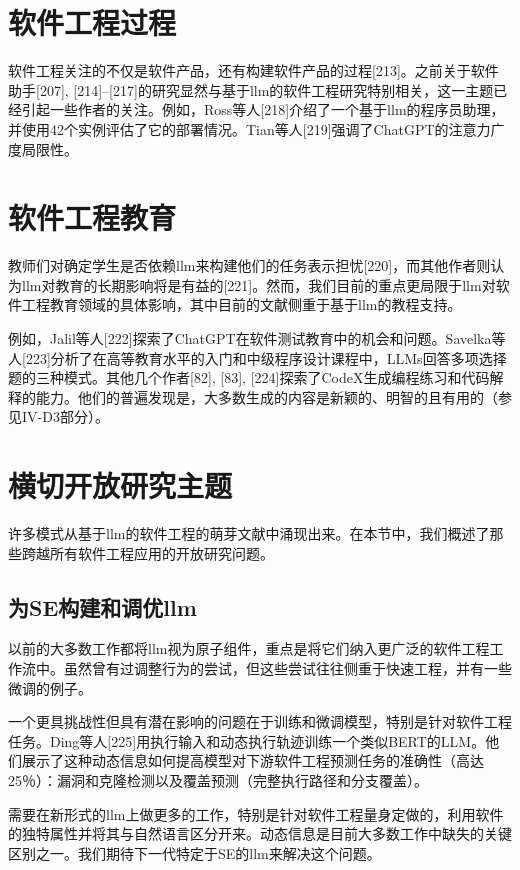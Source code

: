 \begin{translation}
\section{软件工程过程}

软件工程关注的不仅是软件产品，还有构建软件产品的过程[213]。之前关于软件助手[207], [214]–[217]的研究显然与基于llm的软件工程研究特别相关，这一主题已经引起一些作者的关注。例如，Ross等人[218]介绍了一个基于llm的程序员助理，并使用42个实例评估了它的部署情况。Tian等人[219]强调了ChatGPT的注意力广度局限性。

\section{软件工程教育}

教师们对确定学生是否依赖llm来构建他们的任务表示担忧[220]，而其他作者则认为llm对教育的长期影响将是有益的[221]。然而，我们目前的重点更局限于llm对软件工程教育领域的具体影响，其中目前的文献侧重于基于llm的教程支持。

例如，Jalil等人[222]探索了ChatGPT在软件测试教育中的机会和问题。Savelka等人[223]分析了在高等教育水平的入门和中级程序设计课程中，LLMs回答多项选择题的三种模式。其他几个作者[82], [83], [224]探索了CodeX生成编程练习和代码解释的能力。他们的普遍发现是，大多数生成的内容是新颖的、明智的且有用的（参见IV-D3部分）。

\section{横切开放研究主题}

许多模式从基于llm的软件工程的萌芽文献中涌现出来。在本节中，我们概述了那些跨越所有软件工程应用的开放研究问题。

\subsection{为SE构建和调优llm}

以前的大多数工作都将llm视为原子组件，重点是将它们纳入更广泛的软件工程工作流中。虽然曾有过调整行为的尝试，但这些尝试往往侧重于快速工程，并有一些微调的例子。

一个更具挑战性但具有潜在影响的问题在于训练和微调模型，特别是针对软件工程任务。Ding等人[225]用执行输入和动态执行轨迹训练一个类似BERT的LLM。他们展示了这种动态信息如何提高模型对下游软件工程预测任务的准确性（高达25％）：漏洞和克隆检测以及覆盖预测（完整执行路径和分支覆盖）。

需要在新形式的llm上做更多的工作，特别是针对软件工程量身定做的，利用软件的独特属性并将其与自然语言区分开来。动态信息是目前大多数工作中缺失的关键区别之一。我们期待下一代特定于SE的llm来解决这个问题。


\end{translation}
